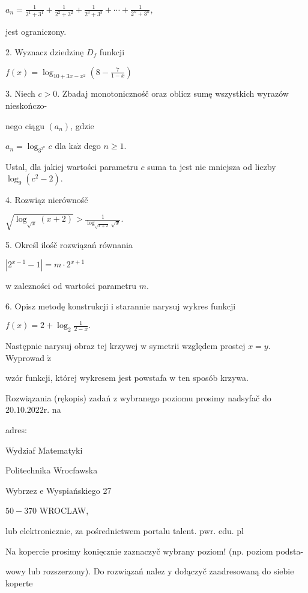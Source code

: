 \documentclass[a4paper,12pt]{article}
\begin{document}
$a_{n}=\displaystyle \frac{1}{2^{1}+3^{1}}+\frac{1}{2^{2}+3^{2}}+\frac{1}{2^{3}+3^{3}}+\cdots+\frac{1}{2^{n}+3^{n}},$

jest ograniczony.

2. Wyznacz dziedzinę $D_{f}$ funkcji

$f(x)=\displaystyle \log_{10+3x-x^{2}}(8-\frac{7}{1-x})$

3. Niech $c>0$. Zbadaj monotonicznośč oraz oblicz sumę wszystkich wyrazów nieskończo-

nego ciągu $(a_{n})$, gdzie

$a_{n}=\log_{3^{3^{n}}}c$ dla $\mathrm{k}\mathrm{a}\dot{\mathrm{z}}$ dego $n\geq 1.$

Ustal, dla jakiej wartości parametru $c$ suma ta jest nie mniejsza od liczby $\log_{9}(c^{2}-2).$

4. Rozwiąz nierównośč

$\displaystyle \sqrt{\log_{\sqrt{x}}(x+2)}>\frac{1}{\log_{\sqrt{x+2}}\sqrt{x}}.$

5. Określ ilośč rozwiązań równania

$|2^{x-1}-1|=m\cdot 2^{x+1}$

$\mathrm{w}$ zalezności od wartości parametru $m.$

6. Opisz metodę konstrukcji $\mathrm{i}$ starannie narysuj wykres funkcji

$f(x)=2+\displaystyle \log_{2}\frac{1}{2-x}.$

Następnie narysuj obraz tej krzywej $\mathrm{w}$ symetrii względem prostej $x =y.$ Wyprowad $\acute{\mathrm{z}}$

wzór funkcji, której wykresem jest powstafa $\mathrm{w}$ ten sposób krzywa.

Rozwiązania (rękopis) zadań $\mathrm{z}$ wybranego poziomu prosimy nadsyfač do $20.10.2022\mathrm{r}$. na

adres:

Wydziaf Matematyki

Politechnika Wrocfawska

Wybrzez $\mathrm{e}$ Wyspiańskiego 27

$50-370$ WROCLAW,

lub elektronicznie, za pośrednictwem portalu talent. $\mathrm{p}\mathrm{w}\mathrm{r}$. edu. pl

Na kopercie prosimy $\underline{\mathrm{k}\mathrm{o}\mathrm{n}\mathrm{i}\mathrm{e}\mathrm{c}\mathrm{z}\mathrm{n}\mathrm{i}\mathrm{e}}$ zaznaczyč wybrany poziom! (np. poziom podsta-

wowy lub rozszerzony). Do rozwiązań nalez $\mathrm{y}$ dołączyč zaadresowaną do siebie koperte
\end{document}
